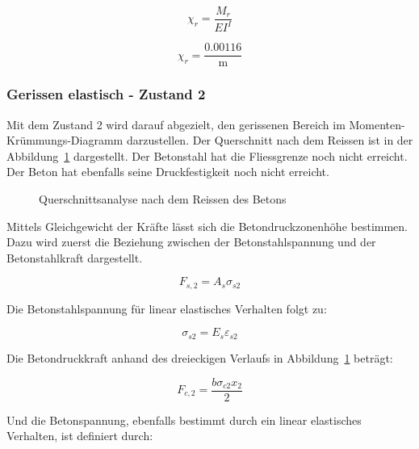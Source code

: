 \documentclass[
  12pt,
  letterpaper,
  egregdoesnotlikesansseriftitles]{scrreprt}
\begin{document}
\begin{equation}\chi_{r} = \frac{M_{r}}{EI^{I}}\end{equation}

\begin{equation}\chi_{r} = \frac{0.00116}{\text{m}}\end{equation}

\subsubsection{Gerissen elastisch - Zustand
2}\label{gerissen-elastisch---zustand-2}

Mit dem Zustand 2 wird darauf abgezielt, den gerissenen Bereich im
Momenten-Krümmungs-Diagramm darzustellen. Der Querschnitt nach dem
Reissen ist in der Abbildung~\ref{fig-qs3} dargestellt. Der Betonstahl
hat die Fliessgrenze noch nicht erreicht. Der Beton hat ebenfalls seine
Druckfestigkeit noch nicht erreicht.

\begin{figure}[H]


\caption{\label{fig-qs3}Querschnittsanalyse nach dem Reissen des Betons}

\end{figure}%

Mittels Gleichgewicht der Kräfte lässt sich die Betondruckzonenhöhe
bestimmen. Dazu wird zuerst die Beziehung zwischen der
Betonstahlspannung und der Betonstahlkraft dargestellt.

\begin{equation}F_{s,2} = A_{s} \sigma_{s 2}\end{equation}

Die Betonstahlspannung für linear elastisches Verhalten folgt zu:

\begin{equation}\sigma_{s 2} = E_{s} \varepsilon_{s2}\end{equation}

Die Betondruckkraft anhand des dreieckigen Verlaufs in
Abbildung~\ref{fig-qs3} beträgt:

\begin{equation}F_{c,2} = \frac{b \sigma_{c 2} x_{2}}{2}\end{equation}

Und die Betonspannung, ebenfalls bestimmt durch ein linear elastisches
Verhalten, ist definiert durch:
\end{document}
